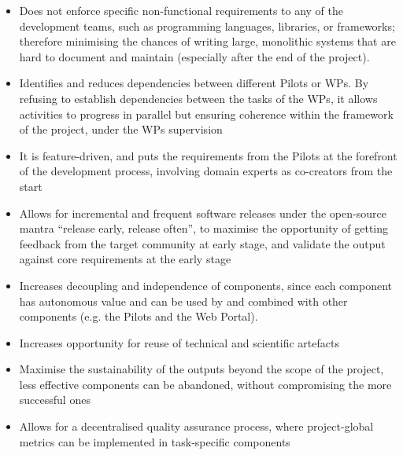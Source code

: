 \begin{itemize}
    \item Does not enforce specific non-functional requirements to any of the development teams, such as programming languages, libraries, or frameworks; therefore minimising the chances of writing large, monolithic systems that are hard to document and maintain (especially after the end of the project). %
    \item Identifies and reduces dependencies between different Pilots or WPs. By refusing to establish dependencies between the tasks of the WPs, it allows activities to progress in parallel but ensuring coherence within the framework of the project, under the WPs supervision
    \item It is feature-driven, and puts the requirements from the Pilots at the forefront of the development process, involving domain experts as co-creators from the start
    \item Allows for incremental and frequent software releases under the open-source mantra ``release early, release often'', to maximise the opportunity of getting feedback from the target community at early stage, and validate the output against core requirements at the early stage
    \item Increases decoupling and independence of components, since each component has autonomous value and can be used by and combined with other components (e.g. the Pilots and the Web Portal). 
    \item Increases opportunity for reuse of technical and scientific artefacts
    \item Maximise the sustainability of the outputs beyond the scope of the project, less effective components can be abandoned, without compromising the more successful ones
    \item Allows for a decentralised quality assurance process, where project-global metrics can be implemented in task-specific components
\end{itemize}

